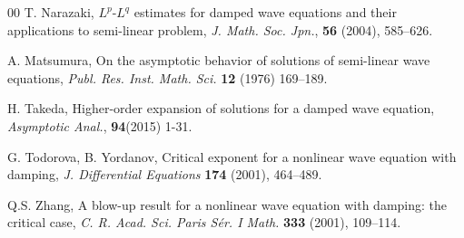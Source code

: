 \documentclass[11pt,reqno]{amsart}
\begin{document}
\begin{thebibliography}{00}
 T. Narazaki, $L^p$-$L^q$ estimates for damped wave equations and their applications to semi-linear problem, \textit{J. Math. Soc. Jpn.}, \textbf{56} (2004), 585--626.


 A. Matsumura, On the asymptotic behavior of solutions of semi-linear wave equations, \textit{Publ. Res. Inst. Math. Sci. } \textbf{12} (1976) 169–189. 

 H. Takeda, Higher-order expansion of solutions for a damped wave equation, \textit{Asymptotic Anal.}, \textbf{94}(2015) 1-31.

 G. Todorova, B. Yordanov, Critical exponent for a nonlinear wave equation with damping, \textit{J. Differential Equations} \textbf{174} (2001), 464–489.


 Q.S. Zhang, A blow-up result for a nonlinear wave equation with damping: the critical case,  \textit{C. R.
Acad. Sci. Paris Sér. I Math. } \textbf{333}  (2001), 109–114.

\end{thebibliography}
\end{document}
